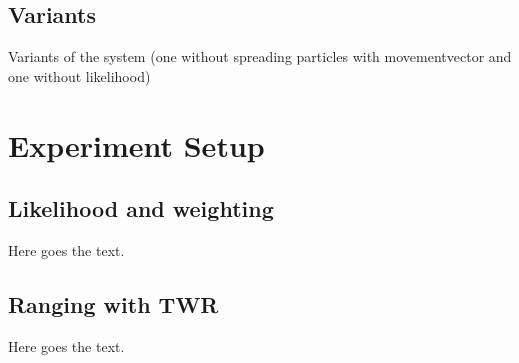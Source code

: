 \subsection{Variants}
Variants of the system (one without spreading particles with movementvector and one without likelihood)



\section{Experiment Setup}


\subsection{Likelihood and weighting}
Here goes the text.


\subsection{Ranging with TWR}
Here goes the text.